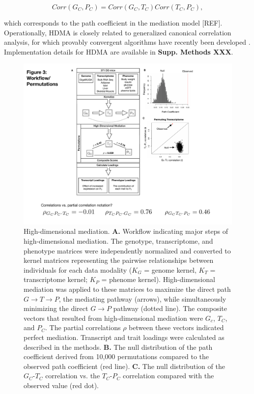 \documentclass[
]{article}
\begin{document}
\begin{equation*}
Corr(G_C,P_C) = Corr(G_C,T_C)Corr(T_C,P_C),
\end{equation*}

which corresponds to the path coefficient in the mediation model
{[}REF{]}. Operationally, HDMA is closely related to generalized
canonical correlation analysis, for which provably convergent algorithms
have recently been developed \cite{rgcca}. Implementation details for
HDMA are available in \textbf{Supp. Methods XXX}.

\begin{figure}[ht!]
\includegraphics[width=5in]{Figures/Fig3_workflow.pdf} 
\caption{High-dimensional mediation. \textbf{A.} Workflow indicating 
major steps of high-dimensional mediation. The genotype, transcriptome, 
and phenotype matrices were independently normalized and converted to 
kernel matrices representing the pairwise relationships between 
individuals for each data modality ($K_G$ = genome kernel, $K_T$ = 
transcriptome kernel; $K_P$ = phenome kernel). 
High-dimensional mediation was applied to these matrices to maximize the 
direct path $G \rightarrow T \rightarrow P$, the mediating pathway (arrows), 
while simultaneously minimizing the direct $G \rightarrow P$ pathway (dotted 
line). The composite vectors that resulted from high-dimensional mediation were 
$G_c$, $T_C$, and $P_C$. The partial correlations $\rho$ between these vectors 
indicated perfect mediation. Transcript and trait loadings were calculated 
as described in the methods. \textbf{B.} The null distribution of the path 
coefficient derived from 10,000 permutations compared to the observed path 
coefficient (red line). \textbf{C.} The null distribution of the $G_C$-$T_C$ 
correlation vs. the $T_C$-$P_C$ correlation compared with the observed value 
(red dot).
}
\label{fig:workflow}
\end{figure}
\end{document}
